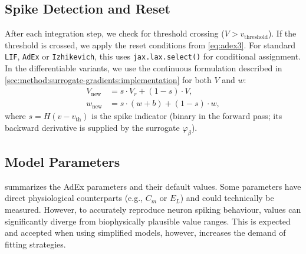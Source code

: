 \subsection{Spike Detection and Reset}\label{sec:method:adex:spike-detection}
After each integration step, we check for threshold crossing ($V > v_{\text{threshold}}$).
If the threshold is crossed, we apply the reset conditions from \cref{eq:adex3}.
For standard \texttt{LIF}, \texttt{AdEx} or \texttt{Izhikevich}, this uses \texttt{jax.lax.select()} for conditional assignment.
In the differentiable variants, we use the continuous formulation described in \cref{sec:method:surrogate-gradients:implementation} for both $V$ and $w$:
\begin{align}
    V_{\text{new}} &= s \cdot V_r + (1 - s) \cdot V, \\
    w_{\text{new}} &= s \cdot (w + b) + (1 - s) \cdot w,
\end{align}
where $s = H(v - v_{\text{th}})$ is the spike indicator (binary in the forward pass; its backward derivative is supplied by the surrogate $\varphi_\beta$).

\subsection{Model Parameters}\label{sec:method:adex:default-parameters}
 summarizes the \gls{AdEx} parameters and their default values.
Some parameters have direct physiological counterparts (e.g., $C_m$ or $E_L$) and could technically be measured.
However, to accurately reproduce neuron spiking behaviour, values can significantly diverge from biophysically plausible value ranges.
This is expected and accepted when using simplified models, however, increases the demand of fitting strategies.

